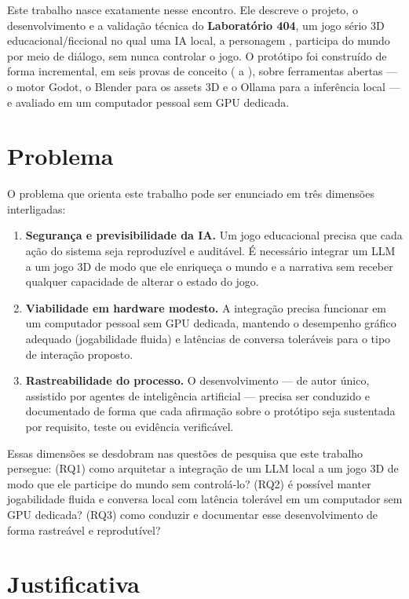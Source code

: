 Este trabalho nasce exatamente nesse encontro. Ele descreve o projeto, o
desenvolvimento e a validação técnica do \textbf{Laboratório 404}, um jogo
sério 3D educacional/ficcional no qual uma IA local, a personagem \aria{},
participa do mundo por meio de diálogo, sem nunca controlar o jogo. O
protótipo foi construído de forma incremental, em seis provas de conceito
( a ), sobre ferramentas abertas --- o motor Godot, o Blender para
os assets 3D e o Ollama para a inferência local --- e avaliado em um
computador pessoal sem GPU dedicada.

\section{Problema}
\label{sec:problema}

O problema que orienta este trabalho pode ser enunciado em três dimensões
interligadas:

\begin{enumerate}
  \item \textbf{Segurança e previsibilidade da IA.} Um jogo educacional
  precisa que cada ação do sistema seja reproduzível e auditável. É necessário
  integrar um LLM a um jogo 3D de modo que ele enriqueça o mundo e a narrativa
  sem receber qualquer capacidade de alterar o estado do jogo.
  \item \textbf{Viabilidade em hardware modesto.} A integração precisa
  funcionar em um computador pessoal sem GPU dedicada, mantendo o desempenho
  gráfico adequado (jogabilidade fluida) e latências de conversa toleráveis
  para o tipo de interação proposto.
  \item \textbf{Rastreabilidade do processo.} O desenvolvimento --- de autor
  único, assistido por agentes de inteligência artificial --- precisa ser
  conduzido e documentado de forma que cada afirmação sobre o protótipo seja
  sustentada por requisito, teste ou evidência verificável.
\end{enumerate}

Essas dimensões se desdobram nas questões de pesquisa que este trabalho
persegue: (RQ1) como arquitetar a integração de um LLM local a um jogo 3D de
modo que ele participe do mundo sem controlá-lo? (RQ2) é possível manter
jogabilidade fluida e conversa local com latência tolerável em um computador
sem GPU dedicada? (RQ3) como conduzir e documentar esse desenvolvimento de
forma rastreável e reprodutível?

\section{Justificativa}
\label{sec:justificativa}

